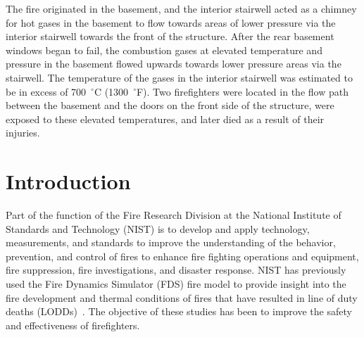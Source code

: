 \documentclass[12pt,oneside]{book}
\begin{document}
The fire originated in the basement, and the interior stairwell acted as a chimney for hot gases in the basement to flow towards areas of lower pressure via the interior stairwell towards the front of the structure. After the rear basement windows began to fail, the combustion gases at elevated temperature and pressure in the basement flowed upwards towards lower pressure areas via the stairwell. The temperature of the gases in the interior stairwell was estimated to be in excess of 700~$^{\circ}$C (1300~$^{\circ}$F). Two firefighters were located in the flow path between the basement and the doors on the front side of the structure, were exposed to these elevated temperatures, and later died as a result of their injuries.


\chapter{Introduction}
\label{sec:introduction}
\setcounter{page}{1}

Part of the function of the Fire Research Division at the National Institute of Standards and Technology (NIST) is to develop and apply technology, measurements, and standards to improve the understanding of the behavior, prevention, and control of fires to enhance fire fighting operations and equipment, fire suppression, fire investigations, and disaster response. NIST has previously used the Fire Dynamics Simulator (FDS) fire model to provide insight into the fire development and thermal conditions of fires that have resulted in line of duty deaths (LODDs)~\cite{Madrzykowski:1,Iowa,Texas,Bryner:Charleston,barowy:texas,Weinschenk:Chicago}. The objective of these studies has been to improve the safety and effectiveness of firefighters.
\end{document}

